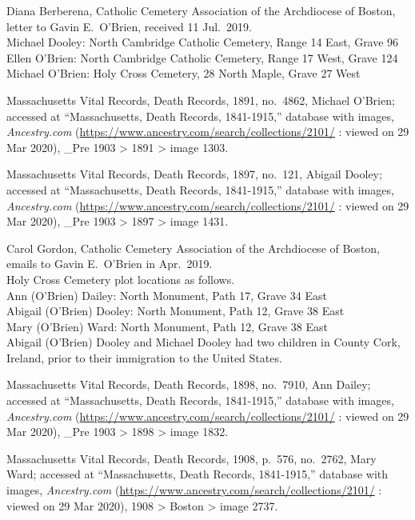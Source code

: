 \begin{thebibliography}{999}
	Diana Berberena, Catholic Cemetery Association of the Archdiocese of Boston, letter to Gavin E.\ O'Brien, received 11 Jul.\ 2019.\\
	Michael Dooley: North Cambridge Catholic Cemetery, Range 14 East, Grave 96\\
	Ellen O’Brien: North Cambridge Catholic Cemetery, Range 17 West, Grave 124\\
	Michael O’Brien: Holy Cross Cemetery, 28 North Maple, Grave 27 West
	
	Massachusetts Vital Records, Death Records, 1891, no.\ 4862, Michael O'Brien; accessed at ``Massachusetts, Death Records, 1841-1915,'' database with images, \textit{Ancestry.com} (\url{https://www.ancestry.com/search/collections/2101/} : viewed on 29 Mar 2020), \_Pre 1903 > 1891 > image 1303.
	
	Massachusetts Vital Records, Death Records, 1897, no.\ 121, Abigail Dooley; accessed at ``Massachusetts, Death Records, 1841-1915,'' database with images, \textit{Ancestry.com} (\url{https://www.ancestry.com/search/collections/2101/} : viewed on 29 Mar 2020), \_Pre 1903 > 1897 > image 1431.
	
	Carol Gordon, Catholic Cemetery Association of the Archdiocese of Boston, emails to Gavin E.\ O'Brien in Apr.\ 2019.\\
	Holy Cross Cemetery plot locations as follows.\\
	Ann (O’Brien) Dailey: North Monument, Path 17, Grave 34 East\\
	Abigail (O’Brien) Dooley: North Monument, Path 12, Grave 38 East\\
	Mary (O’Brien) Ward: North Monument, Path 12, Grave 38 East\\
	
	Abigail (O'Brien) Dooley and Michael Dooley had two children in County Cork, Ireland, prior to their immigration to the United States. 
	
	Massachusetts Vital Records, Death Records, 1898, no.\ 7910, Ann Dailey; accessed at ``Massachusetts, Death Records, 1841-1915,'' database with images, \textit{Ancestry.com} (\url{https://www.ancestry.com/search/collections/2101/} : viewed on 29 Mar 2020), \_Pre 1903 > 1898 > image 1832.
	
	Massachusetts Vital Records, Death Records, 1908, p.\ 576, no.\ 2762, Mary Ward; accessed at ``Massachusetts, Death Records, 1841-1915,'' database with images, \textit{Ancestry.com} (\url{https://www.ancestry.com/search/collections/2101/} : viewed on 29 Mar 2020), 1908 > Boston > image 2737.
	

\end{thebibliography}
